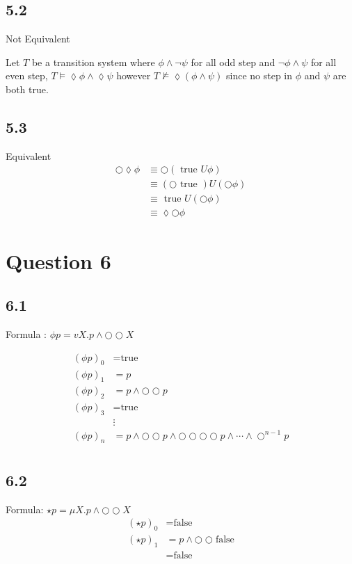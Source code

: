 \documentclass[a4paper, 11pt]{article}
\begin{document}
\subsection*{5.2}
Not Equivalent

Let $T$ be a transition system where $\phi\land\lnot\psi$ for all odd step and $\lnot\phi\land\psi$ for all even step, $T\models\lozenge\phi\land\lozenge\psi$ however $T\not\models\lozenge(\phi\land\psi)$ since no step in $\phi$ and $\psi$ are both true.
\subsection*{5.3}
Equivalent
\begin{align*}
    \bigcirc\lozenge\phi & \equiv \bigcirc (\text{ true } U \phi) \\
                    & \equiv  (\bigcirc\text{ true }) U (\bigcirc\phi) \\
                    & \equiv \text{ true } U (\bigcirc\phi) \\
                    & \equiv \lozenge\bigcirc\phi
\end{align*}

\section*{Question 6}
\subsection*{6.1}
Formula : $\phi p = vX.p\land \bigcirc\bigcirc X$

\begin{align*}
    (\phi p)_0 & = \text{true} \\
    (\phi p)_1 & = p \\
    (\phi p)_2 & = p \land \bigcirc\bigcirc p \\
    (\phi p)_3 & = \text{true} \\
                     & \vdots  \\
    (\phi p)_n & = p \land \bigcirc \bigcirc p \land \bigcirc\bigcirc\bigcirc\bigcirc p \land \cdots \land \bigcirc^{n-1} p \\
\end{align*}
  
\subsection*{6.2}
Formula: $\star p = \mu X.p\land \bigcirc\bigcirc X$
\begin{align*}
    (\star p)_0 & = \text{false} \\
    (\star p)_1 & = p \land \bigcirc\bigcirc \text{false} \\
    & =\text{false}
\end{align*}
\end{document}
